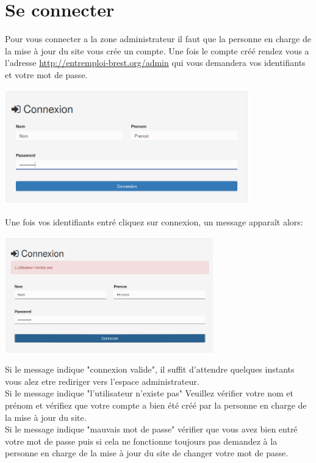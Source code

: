 \documentclass[a4paper, 12pt]{report}
\begin{document}
\section{Se connecter}
Pour vous connecter a la zone administrateur il faut que la personne en charge de la mise à jour du site vous crée un compte.
Une fois le compte créé rendez vous a l'adresse \url{http://entremploi-brest.org/admin} qui vous demandera vos identifiants et votre mot de passe.
\begin{center}
\includegraphics[height=5cm]{login.png}\\
\end{center}
Une fois vos identifiants entré cliquez sur connexion, un message apparaît alors:\\
\begin{center}
\includegraphics[height=5cm]{loginMessage.png}
\end{center}
Si le message indique "connexion valide", il suffit d'attendre quelques instants vous alez etre rediriger vers l'espace administrateur.\\
Si le message indique "l'utilisateur n'existe pas" Veuillez vérifier votre nom et prénom et vérifiez que votre compte a bien été créé par la personne en charge de la mise à jour du site.\\
Si le message indique "mauvais mot de passe" vérifier que vous avez bien entré votre mot de passe puis si cela ne fonctionne toujours pas demandez à la personne en charge de la mise à jour du site de changer votre mot de passe.
\end{document}
